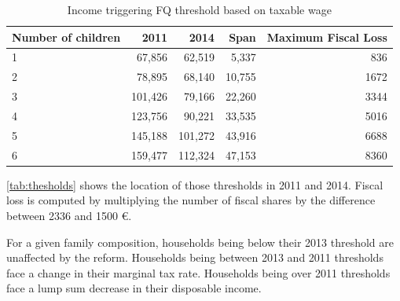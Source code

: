   \begin{table}[H]
  \caption{Income triggering FQ threshold based on taxable wage}
  \label{tab:thesholds}
  \centering
  \begin{tabular}{lrrrr}
  \toprule
  {Number of children} &                 2011 &                 2014  & Span & Maximum Fiscal Loss\\
  \midrule
  1 &         67,856  &         62,519               & 5,337 & 836  \\
  2 &         78,895  &         68,140                 &10,755 & 1672 \\
  3 &         101,426 &         79,166              &22,260 & 3344 \\
  4 &         123,756 &         90,221              &33,535 & 5016 \\
  5 &         145,188 &         101,272              &43,916 & 6688 \\
  6 &         159,477 &         112,324              &47,153 & 8360 \\
  \bottomrule
  \end{tabular}

  \end{table}

 
%
%






\autoref{tab:thesholds} shows the location of those thresholds in 2011 and 2014. Fiscal loss is computed by multiplying the number of fiscal shares by the difference between 2336 and 1500 \euro{}.

  For a given family composition, households being below their 2013 threshold are unaffected by the reform. Households being between 2013 and 2011 thresholds face a change in their marginal tax rate. Households being over 2011 thresholds face a lump sum decrease in their disposable income.




\medskip





%
%
%


